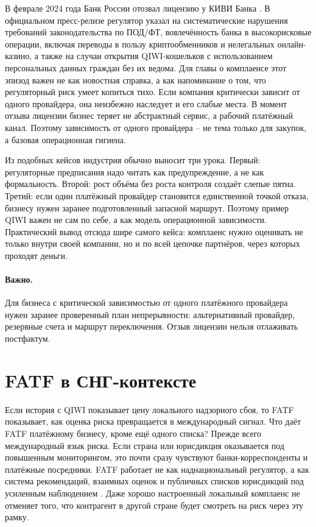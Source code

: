 В феврале 2024 года Банк России отозвал лицензию у КИВИ Банка
\cite{cbr-qiwi-license-2024}. В официальном пресс-релизе
регулятор указал на систематические нарушения требований
законодательства по ПОД/ФТ, вовлечённость банка в высокорисковые
операции, включая переводы в пользу криптообменников и нелегальных
онлайн-казино, а также на случаи открытия QIWI-кошельков с
использованием персональных данных граждан без их ведома. Для главы
о комплаенсе этот эпизод важен не как новостная справка, а как
напоминание о том, что регуляторный риск умеет копиться тихо. Если
компания критически зависит от одного провайдера, она неизбежно
наследует и его слабые места. В момент отзыва лицензии бизнес теряет
не абстрактный сервис, а рабочий платёжный канал. Поэтому
зависимость от одного провайдера -- не тема только для закупок, а
базовая операционная гигиена.

Из подобных кейсов индустрия обычно выносит три урока. Первый:
регуляторные предписания надо читать как предупреждение, а не как
формальность. Второй: рост объёма без роста контроля создаёт
слепые пятна. Третий: если один платёжный провайдер становится
единственной точкой отказа, бизнесу нужен заранее подготовленный
запасной маршрут. Поэтому пример QIWI важен не сам по себе, а как
модель операционной зависимости. Практический вывод отсюда шире
самого кейса: комплаенс нужно оценивать не только внутри своей
компании, но и по всей цепочке партнёров, через которых проходят
деньги.

\paragraph{Важно.}
Для бизнеса с критической зависимостью от одного платёжного провайдера нужен заранее проверенный план непрерывности: альтернативный провайдер, резервные счета и маршрут переключения. Отзыв лицензии нельзя отлаживать постфактум.


\section{FATF в СНГ-контексте}
\label{sec:compliance-fatf}

Если история с QIWI показывает цену локального надзорного сбоя, то
FATF показывает, как оценка риска превращается в международный
сигнал. Что даёт FATF платёжному бизнесу, кроме ещё одного списка?
Прежде всего международный язык риска. Если страна или юрисдикция
оказывается под повышенным мониторингом, это почти сразу чувствуют
банки-корреспонденты и платёжные посредники. FATF работает не как
наднациональный регулятор, а как система рекомендаций, взаимных
оценок и публичных списков юрисдикций под усиленным наблюдением
\cite{fatf-recs}\cite{fatf-increased-monitoring}. Даже
хорошо настроенный локальный комплаенс не отменяет того, что
контрагент в другой стране будет смотреть на риск через эту рамку.


